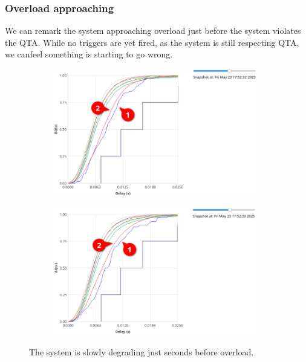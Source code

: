         \subsubsection{Overload approaching}
            We can remark the system approaching overload just before the system violates the QTA. While no triggers are yet fired, as the system is still respecting QTA, we canfeel something is starting to go wrong.
        \begin{figure}[H]
            \centering
            \begin{subfigure}{.5\textwidth}
                \centering
                \includegraphics[width=0.98\textwidth]{img/early_sign2.png}
                \label{fig:appr_ov_2}
            \end{subfigure}%
            \begin{subfigure}{.5\textwidth}
                \centering
                \includegraphics[width =0.98\textwidth]{img/approaching_2.png}
                \label{fig:appr_ov}
            \end{subfigure}
            \label{fig:appr_ov_t}
            \caption{The system is slowly degrading just seconds before overload.}
            \end{figure}
        
